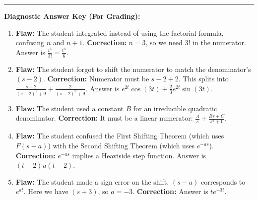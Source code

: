 \documentclass[11pt, a4paper]{article}
\theoremstyle{definition}
\theoremstyle{remark}
\begin{document}
\vspace{1em}
\hrule
\vspace{1em}
\textbf{Diagnostic Answer Key (For Grading):}
\begin{enumerate}
    \item \textbf{Flaw:} The student integrated instead of using the factorial formula, confusing $n$ and $n+1$. \textbf{Correction:} $n=3$, so we need $3!$ in the numerator. Answer is $\frac{t^3}{3!} = \frac{t^3}{6}$.
    \item \textbf{Flaw:} The student forgot to shift the numerator to match the denominator's $(s-2)$. \textbf{Correction:} Numerator must be $s - 2 + 2$. This splits into $\frac{s-2}{(s-2)^2+9} + \frac{2}{(s-2)^2+9}$. Answer is $e^{2t}\cos(3t) + \frac{2}{3}e^{2t}\sin(3t)$.
    \item \textbf{Flaw:} The student used a constant $B$ for an irreducible quadratic denominator. \textbf{Correction:} It must be a linear numerator: $\frac{A}{s} + \frac{Bs+C}{s^2+1}$.
    \item \textbf{Flaw:} The student confused the First Shifting Theorem (which uses $F(s-a)$) with the Second Shifting Theorem (which uses $e^{-as}$). \textbf{Correction:} $e^{-as}$ implies a Heaviside step function. Answer is $(t-2)u(t-2)$.
    \item \textbf{Flaw:} The student made a sign error on the shift. $(s-a)$ corresponds to $e^{at}$. Here we have $(s+3)$, so $a = -3$. \textbf{Correction:} Answer is $t e^{-3t}$.
\end{enumerate}
\end{document}

